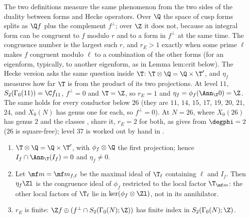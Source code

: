 The two definitions measure the same phenomenon from the two sides of the duality between forms and Hecke operators. Over $\Q$ the space of cusp forms splits as $\Q f$ plus the
complement $f^\perp$; over $\Z$ it does not, because an integral form can be congruent to $f$ modulo $r$ and to a form in $f^\perp$ at the same time. The congruence number is the
largest such $r$, and $r_E>1$ exactly when some prime $\ell$ makes $f$ congruent modulo $\ell$ to a combination of the other forms (for an eigenform, typically, to another
eigenform, as in Lemma lem:crit below). The Hecke version asks the same question inside $\T$: $\T\otimes\Q=\Q\times\T'$, and $\eta_f$ measures how far $\T$ is from the product of its two
projections. At level $11$, $S_2(\Gamma_0(11))=\C f_{11}$, $f^\perp=0$ and $\T=\Z$, so $r_E=1$ and $\eta_f=\phi_f(\Ann_\Z0)=\Z$. The same holds for every conductor below $26$ (they are $11$, $14$, $15$, $17$, $19$, $20$, $21$, $24$, and $X_0(N)$ has genus one for each,
so $f^\perp=0$). At $N=26$, where $X_0(26)$ has genus $2$ and the classes ,  share it, $r_E=2$ for both, as  gives from $\degphi=2$ ($26$ is
square-free); level $37$ is worked out by hand in .

\begin{proposition}\label{prop:moddeg:congruence-ideal}
\leavevmode
\begin{enumerate}[label=(\roman*)]
\item $\T\otimes\Q=\Q\times\T'$, with $\phi_f\otimes\Q$ the first projection; hence $I_f\cap\Ann_\T(I_f)=0$ and $\eta_f\ne0$.
\item Let $\mf m=\mf m_{f,\ell}$ be the maximal ideal of $\T_\ell$ containing $\ell$ and $I_f$. Then $\eta_f\Zl$ is the congruence ideal of $\phi_f$ restricted to the local factor $\T_{\mf m}$: the other
local factors of $\T_\ell$ lie in $\ker(\phi_f\otimes\Zl)$, not in its annihilator.
\item $r_E$ is finite: $\Z f\oplus(f^\perp\cap S_2(\Gamma_0(N);\Z))$ has finite index in $S_2(\Gamma_0(N);\Z)$.
\end{enumerate}
\end{proposition}


